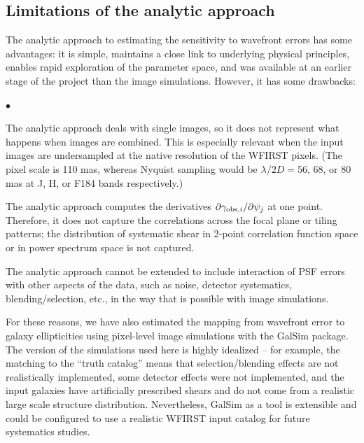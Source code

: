 \documentclass[aps,prd, amsmath,amssymb,superscriptaddress,showkeys,nofootinbib,reprint,preprintnumbers]{revtex4-1}
\begin{document}
\subsection{Limitations of the analytic approach}

The analytic approach to estimating the sensitivity to wavefront errors has some advantages: it is simple, maintains a close link to underlying physical principles, enables rapid exploration of the parameter space, and was available at an earlier stage of the project than the image simulations. However, it has some drawbacks:
\begin{list}{$\bullet$}{}
\item The analytic approach deals with single images, so it does not represent what happens when images are combined. This is especially relevant when the input images are undersampled at the native resolution of the WFIRST pixels. (The pixel scale is 110 mas, whereas Nyquist sampling would be $\lambda/2D = 56$, 68, or 80 mas at J, H, or F184 bands respectively.)
\item The analytic approach computes the derivatives $\partial\gamma_{{\rm obs},i}/\partial\psi_j$ at one point. Therefore, it does not capture the correlations across the focal plane or tiling patterns; the distribution of systematic shear in 2-point correlation function space or in power spectrum space is not captured.
\item The analytic approach cannot be extended to include interaction of PSF errors with other aspects of the data, such as noise, detector systematics, blending/selection, etc., in the way that is possible with image simulations.
\end{list}
For these reasons, we have also estimated the mapping from wavefront error to galaxy ellipticities using pixel-level image simulations with the {\sc GalSim} package. The version of the simulations used here is highly idealized -- for example, the matching to the ``truth catalog'' means that selection/blending effects are not realistically implemented, some detector effects were not implemented, and the input galaxies have artificially prescribed shears and do not come from a realistic large scale structure distribution. Nevertheless, {\sc GalSim} as a tool is extensible and could be configured to use a realistic WFIRST input catalog for future systematics studies.

\end{document}
